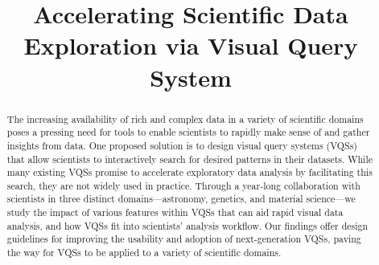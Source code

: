 \documentclass[sigchi]{acmart}
\begin{document}
\title{Accelerating Scientific Data Exploration via Visual Query System}

\begin{abstract}
The increasing availability of rich and complex data in a variety of scientific domains poses a pressing need for tools to enable scientists to rapidly make sense of and gather insights from data. One proposed solution is to design visual query systems (VQSs) that allow scientists to interactively search for desired patterns in their datasets. While many existing VQSs promise to accelerate exploratory data analysis by facilitating this search, they are not widely used in practice. Through a year-long collaboration with scientists in three distinct domains---astronomy, genetics, and material science---we study the impact of various features within VQSs that can aid rapid visual data analysis, and how VQSs fit into scientists' analysis workflow. Our findings offer design guidelines for improving the usability and adoption of next-generation VQSs, paving the way for VQSs to be applied to a variety of scientific domains.
\end{abstract}
\maketitle









\end{document}
